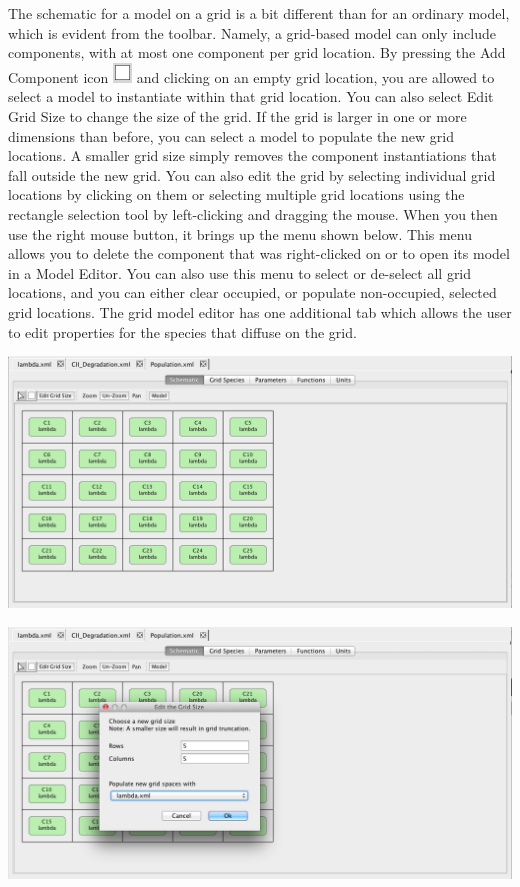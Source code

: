 \documentclass[titlepage,11pt]{article}
\begin{document}
The schematic for a model on a grid is a bit different than for an ordinary model, which is evident from the toolbar.  Namely, a grid-based model can only include components, with at most one component per grid location.  By pressing the Add Component icon \includegraphics{../gui/icons/modelview/add_component_selected} and clicking on an empty grid location, you are allowed to select a model to instantiate within that grid location.  You can also select Edit Grid Size to change the size of the grid.  If the grid is larger in one or more dimensions than before, you can select a model to populate the new grid locations.  A smaller grid size simply removes the component instantiations that fall outside the new grid.  You can also edit the grid by selecting individual grid locations by clicking on them or selecting multiple grid locations using the rectangle selection tool by left-clicking and dragging the mouse.  When you then use the right mouse button, it brings up the menu shown below.  This menu allows you to delete the component that was right-clicked on or to open its model in a Model Editor.  You can also use this menu to select or de-select all grid locations, and you can either clear occupied, or populate non-occupied, selected grid locations.  The grid model editor has one additional tab which allows the user to edit properties for the species that diffuse on the grid.

\begin{center}
\includegraphics[width=140mm]{screenshots/gridModel}
\end{center}

\begin{center}
\includegraphics[width=140mm]{screenshots/editGridSize}
\end{center}
\end{document}
